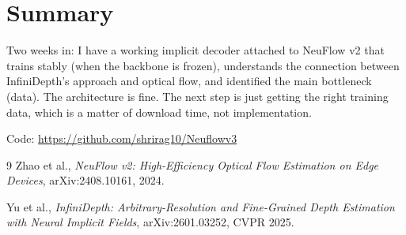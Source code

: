 \documentclass[11pt,a4paper]{article}
\begin{document}
\section*{Summary}

Two weeks in: I have a working implicit decoder attached to NeuFlow v2 that trains stably (when the backbone is frozen), understands the connection between InfiniDepth's approach and optical flow, and identified the main bottleneck (data). The architecture is fine. The next step is just getting the right training data, which is a matter of download time, not implementation.

Code: \url{https://github.com/shrirag10/Neuflowv3}

\begin{thebibliography}{9}
Zhao et al., \emph{NeuFlow v2: High-Efficiency Optical Flow Estimation on Edge Devices}, arXiv:2408.10161, 2024.

Yu et al., \emph{InfiniDepth: Arbitrary-Resolution and Fine-Grained Depth Estimation with Neural Implicit Fields}, arXiv:2601.03252, CVPR 2025.
\end{thebibliography}
\end{document}
